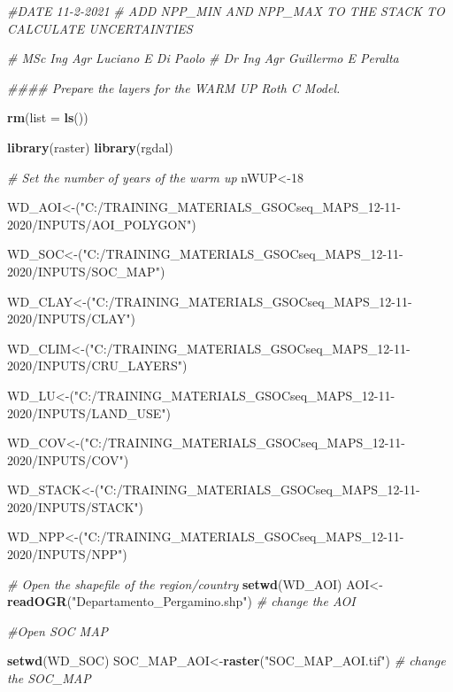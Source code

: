 \documentclass[
  10pt,
  b5paper,
]{book}
\newenvironment{Shaded}{\begin{snugshade}}{\end{snugshade}}
\newcommand{\CommentTok}[1]{\textcolor[rgb]{0.56,0.35,0.01}{\textit{#1}}}
\newcommand{\DataTypeTok}[1]{\textcolor[rgb]{0.13,0.29,0.53}{#1}}
\newcommand{\DecValTok}[1]{\textcolor[rgb]{0.00,0.00,0.81}{#1}}
\newcommand{\KeywordTok}[1]{\textcolor[rgb]{0.13,0.29,0.53}{\textbf{#1}}}
\newcommand{\NormalTok}[1]{#1}
\newcommand{\StringTok}[1]{\textcolor[rgb]{0.31,0.60,0.02}{#1}}
\begin{document}
\begin{Shaded}
\begin{Highlighting}[]
\CommentTok{#DATE 11-2-2021}
\CommentTok{# ADD NPP_MIN AND NPP_MAX TO THE STACK TO CALCULATE UNCERTAINTIES}

\CommentTok{# MSc Ing Agr Luciano E Di Paolo}
\CommentTok{# Dr Ing Agr Guillermo E Peralta}


\CommentTok{#### Prepare the layers for the WARM UP Roth C Model. }

\KeywordTok{rm}\NormalTok{(}\DataTypeTok{list =} \KeywordTok{ls}\NormalTok{())}

\KeywordTok{library}\NormalTok{(raster)}
\KeywordTok{library}\NormalTok{(rgdal)}

\CommentTok{# Set the number of years of the warm up}
\NormalTok{nWUP<-}\DecValTok{18}

\NormalTok{WD_AOI<-(}\StringTok{"C:/TRAINING_MATERIALS_GSOCseq_MAPS_12-11-2020/INPUTS/AOI_POLYGON"}\NormalTok{)}

\NormalTok{WD_SOC<-(}\StringTok{"C:/TRAINING_MATERIALS_GSOCseq_MAPS_12-11-2020/INPUTS/SOC_MAP"}\NormalTok{)}

\NormalTok{WD_CLAY<-(}\StringTok{"C:/TRAINING_MATERIALS_GSOCseq_MAPS_12-11-2020/INPUTS/CLAY"}\NormalTok{)}

\NormalTok{WD_CLIM<-(}\StringTok{"C:/TRAINING_MATERIALS_GSOCseq_MAPS_12-11-2020/INPUTS/CRU_LAYERS"}\NormalTok{)}

\NormalTok{WD_LU<-(}\StringTok{"C:/TRAINING_MATERIALS_GSOCseq_MAPS_12-11-2020/INPUTS/LAND_USE"}\NormalTok{)}

\NormalTok{WD_COV<-(}\StringTok{"C:/TRAINING_MATERIALS_GSOCseq_MAPS_12-11-2020/INPUTS/COV"}\NormalTok{)}

\NormalTok{WD_STACK<-(}\StringTok{"C:/TRAINING_MATERIALS_GSOCseq_MAPS_12-11-2020/INPUTS/STACK"}\NormalTok{)}

\NormalTok{WD_NPP<-(}\StringTok{"C:/TRAINING_MATERIALS_GSOCseq_MAPS_12-11-2020/INPUTS/NPP"}\NormalTok{)}


\CommentTok{# Open the shapefile of the region/country}
\KeywordTok{setwd}\NormalTok{(WD_AOI)}
\NormalTok{AOI<-}\KeywordTok{readOGR}\NormalTok{(}\StringTok{"Departamento_Pergamino.shp"}\NormalTok{) }\CommentTok{# change the AOI}

\CommentTok{#Open SOC MAP }

\KeywordTok{setwd}\NormalTok{(WD_SOC)}
\NormalTok{SOC_MAP_AOI<-}\KeywordTok{raster}\NormalTok{(}\StringTok{"SOC_MAP_AOI.tif"}\NormalTok{) }\CommentTok{# change the SOC_MAP}


\end{Highlighting}
\end{Shaded}
\end{document}
